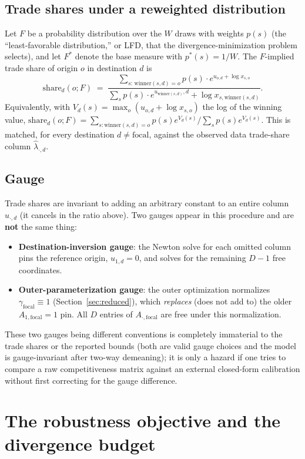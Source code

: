 \documentclass[11pt]{article}
\begin{document}
\subsection{Trade shares under a reweighted distribution}
Let $F$ be a probability distribution over the $W$ draws with weights $p(s)$ (the ``least-favorable
distribution,'' or LFD, that the divergence-minimization problem selects), and let $F^*$ denote the
base measure with $p^*(s)=1/W$. The $F$-implied trade share of origin $o$ in destination $d$ is
\[
\mathrm{share}_d(o;F) \;=\; \frac{\sum_{s:\,\text{winner}(s,d)=o} p(s)\cdot e^{u_{o,d}+\log x_{s,o}}}
{\sum_s p(s)\cdot e^{u_{\text{winner}(s,d)},d} + \log x_{s,\text{winner}(s,d)}}.
\]
Equivalently, with $V_d(s)=\max_o(u_{o,d}+\log x_{s,o})$ the log of the winning value,
$\mathrm{share}_d(o;F)=\sum_{s:\text{winner}(s,d)=o} p(s)e^{V_d(s)}\big/\sum_s p(s)e^{V_d(s)}$. This
is matched, for every destination $d\neq\text{focal}$, against the observed data trade-share column
$\hat\lambda_{\cdot,d}$.

\subsection{Gauge}
Trade shares are invariant to adding an arbitrary constant to an entire column $u_{\cdot,d}$ (it
cancels in the ratio above). Two gauges appear in this procedure and are \textbf{not} the same
thing:
\begin{itemize}
  \item \textbf{Destination-inversion gauge}: the Newton solve for each omitted column pins the
  reference origin, $u_{1,d}=0$, and solves for the remaining $D-1$ free coordinates.
  \item \textbf{Outer-parameterization gauge}: the outer optimization normalizes $\gamma_{\text{focal}}
  \equiv 1$ (Section~\ref{sec:reduced}), which \emph{replaces} (does not add to) the older
  $A_{1,\text{focal}}=1$ pin. All $D$ entries of $A_{\cdot,\text{focal}}$ are free under this
  normalization.
\end{itemize}
These two gauges being different conventions is completely immaterial to the trade shares or the
reported bounds (both are valid gauge choices and the model is gauge-invariant after two-way
demeaning); it is only a hazard if one tries to compare a raw competitiveness matrix against an
external closed-form calibration without first correcting for the gauge difference.

\section{The robustness objective and the divergence budget}
\label{sec:objective}
\end{document}
